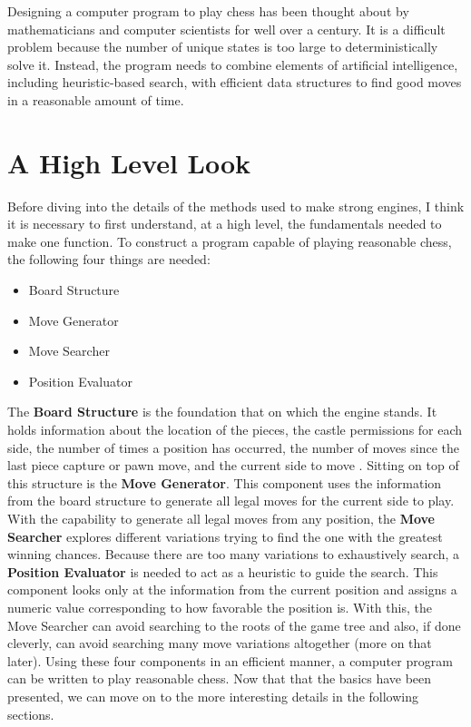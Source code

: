 \documentclass[11pt]{article}
\begin{document}
Designing a computer program to play chess has been thought about by mathematicians and computer scientists for well over a century. It is a difficult problem because the number of unique states is too large to deterministically solve it. Instead, the program needs to combine elements of artificial intelligence, including heuristic-based search, with efficient data structures to find good moves in a reasonable amount of time.

\section{A High Level Look}
Before diving into the details of the methods used to make strong engines, I think it is necessary to first understand, at a high level, the fundamentals needed to make one function. To construct a program capable of playing reasonable chess, the following four things are needed:

\begin{itemize}[noitemsep]
  \item Board Structure
  \item Move Generator
  \item Move Searcher
  \item Position Evaluator
\end{itemize}

The \textbf{Board Structure} is the foundation that on which the engine stands. It holds information about the location of the pieces, the castle permissions for each side, the number of times a position has occurred, the number of moves since the last piece capture or pawn move, and the current side to move \cite{bovskovic2005representation, shannon1950xxii}. Sitting on top of this structure is the \textbf{Move Generator}. This component uses the information from the board structure to generate all legal moves for the current side to play. With the capability to generate all legal moves from any position, the \textbf{Move Searcher} explores different variations trying to find the one with the greatest winning chances. Because there are too many variations to exhaustively search, a \textbf{Position Evaluator} is needed to act as a heuristic to guide the search. This component looks only at the information from the current position and assigns a numeric value corresponding to how favorable the position is. With this, the Move Searcher can avoid searching to the roots of the game tree and also, if done cleverly, can avoid searching many move variations altogether (more on that later). Using these four components in an efficient manner, a computer program can be written to play reasonable chess. Now that that the basics have been presented, we can move on to the more interesting details in the following sections.
\end{document}
